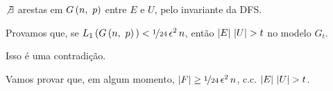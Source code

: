 \begin{fato}
  $\not\exists$ arestas em $G\left(n,\ p\vphantom{1j}\right)$ entre $E$ e $U$, pelo invariante da DFS.
\end{fato}

Provamos que, se $L_1\left(G\left(n,\ p\vphantom{1j}\right)\vphantom{1j}\right)<\nicefrac{1}{24}\,\epsilon^2\,n$, então $\left|E\vphantom{1j}\right|\,\left|U\vphantom{1j}\right|>t$ no modelo $G_t$.

Isso é uma contradição.

Vamos provar que, em algum momento, $\left|F\vphantom{1j}\right|\geq\nicefrac{1}{24}\,\epsilon^2\,n$, c.c. $\left|E\vphantom{1j}\right|\,\left|U\vphantom{1j}\right|>t$.
